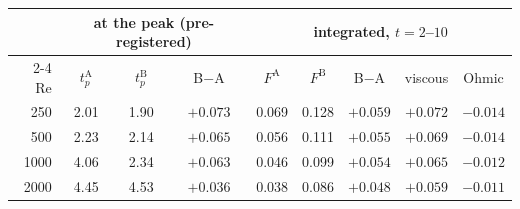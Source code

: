 \begin{tabular}{rcccccccc}
 & \multicolumn{3}{c}{at the peak (pre-registered)} & \multicolumn{5}{c}{integrated, $t=2$--$10$} \\
\cline{2-4}\cline{5-9}
$\mathrm{Re}$ & $t_p^{\mathrm{A}}$ & $t_p^{\mathrm{B}}$ & B$-$A & $F^{\mathrm{A}}$ & $F^{\mathrm{B}}$ & B$-$A & viscous & Ohmic \\
\hline
250 & 2.01 & 1.90 & $+0.073$ & 0.069 & 0.128 & $+0.059$ & $+0.072$ & $-0.014$ \\
500 & 2.23 & 2.14 & $+0.065$ & 0.056 & 0.111 & $+0.055$ & $+0.069$ & $-0.014$ \\
1000 & 4.06 & 2.34 & $+0.063$ & 0.046 & 0.099 & $+0.054$ & $+0.065$ & $-0.012$ \\
2000 & 4.45 & 4.53 & $+0.036$ & 0.038 & 0.086 & $+0.048$ & $+0.059$ & $-0.011$ \\
\end{tabular}
